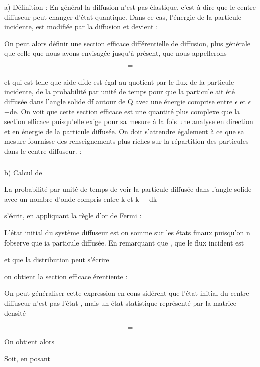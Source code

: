 \subsubsection{}%
a) Définition :
En général la diffusion n'est pas élastique, c'est-à-dire que le
centre diffuseur peut changer d'état quantique. Dans ce cas, l'énergie de la
particule incidente,  est modifiée par la diffusion et devient :

On peut alors définir une section efficace différentielle de diffusion, plus générale
que celle que nous avons envisagée jusqu'à présent, que nous appellerons

\[
\tag{122}=
\]
\[
\tag{123}=
\]

 et qui est telle que aide dfde est égal au quotient par le flux
de la particule incidente, de la probabilité par unité de temps pour que la
particule ait été diffusée dans l'angle solide df autour de Q avec une énergie comprise
entre $\epsilon$ et $\epsilon$ +de. On voit que cette section efficace est une
quantité plus complexe que la section efficace puisqu'elle exige pour
sa mesure à la fois une analyse en direction et en énergie de la particule
diffusée. On doit s'attendre également à ce que sa mesure fournisse des
renseignements plus riches sur la répartition des particules dans le centre
diffuseur. :

\subsubsection{}%
b) Calcul de 

La probabilité par unité de temps de voir la particule diffusée
dans l'angle solide  avec un nombre d'onde compris entre k et k + dk

s'écrit, en appliquant la règle d'or de Fermi :

L'état initial du système diffuseur est  on somme sur les états finaux
 puisqu'on n fobserve que ia particule diffusée.
En remarquant que  , que le flux incident est 

et que la distribution  peut s'écrire

on obtient la section efficace érentiente :

On peut généraliser cette expression en cons sidérent que l'état initial du centre
diffuseur n'est pas l'état  , mais un état statistique représenté par la
matrice densité

\[
\tag{127}=
\]
\[
\tag{128}=
\]


On obtient alors

Soit, en posant

